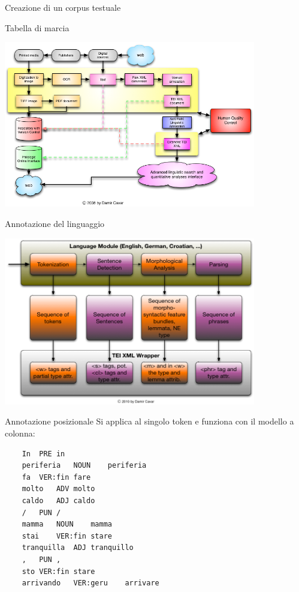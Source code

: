 \documentclass[pdf]{prosper}
\begin{document}
\begin{tsectionandpart}{Creazione di un corpus testuale}

\begin{slide}{Tabella di marcia}
\begin{center}
\includegraphics[width=11cm]{corpusprocess}
\end{center}
\end{slide}

\begin{slide}{Annotazione del linguaggio}
\begin{center}
\includegraphics[width=11cm]{langproc}
\end{center}
\end{slide}

\begin{slide}{Annotazione posizionale}
Si applica al singolo token e funziona con il modello a colonna:
	\begin{verbatim}
	In	PRE	in
	periferia	NOUN	periferia
	fa	VER:fin	fare
	molto	ADV	molto
	caldo	ADJ	caldo
	/	PUN	/
	mamma	NOUN	mamma
	stai	VER:fin	stare
	tranquilla	ADJ	tranquillo
	,	PUN	,
	sto	VER:fin	stare
	arrivando	VER:geru	arrivare
	\end{verbatim}
	

\end{slide}
\end{tsectionandpart}
\end{document}
